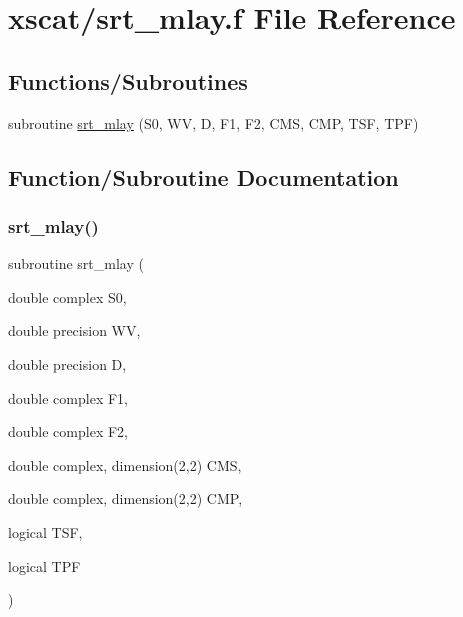 \hypertarget{xscat_2srt__mlay_8f}{}\section{xscat/srt\+\_\+mlay.f File Reference}
\label{xscat_2srt__mlay_8f}
\subsection*{Functions/\+Subroutines}
\begin{DoxyCompactItemize}
\item 
subroutine \hyperlink{xscat_2srt__mlay_8f_ac1f780c78dc47c36f66b47b0ea9c140f}{srt\+\_\+mlay} (S0, WV, D, F1, F2, C\+MS, C\+MP, T\+SF, T\+PF)
\end{DoxyCompactItemize}


\subsection{Function/\+Subroutine Documentation}
\mbox{\label{xscat_2srt__mlay_8f_ac1f780c78dc47c36f66b47b0ea9c140f}} 
\subsubsection{\texorpdfstring{srt\+\_\+mlay()}{srt\_mlay()}}
{\footnotesize\ttfamily subroutine srt\+\_\+mlay (\begin{DoxyParamCaption}\item[{double complex}]{S0,  }\item[{double precision}]{WV,  }\item[{double precision}]{D,  }\item[{double complex}]{F1,  }\item[{double complex}]{F2,  }\item[{double complex, dimension(2,2)}]{C\+MS,  }\item[{double complex, dimension(2,2)}]{C\+MP,  }\item[{logical}]{T\+SF,  }\item[{logical}]{T\+PF }\end{DoxyParamCaption})}

